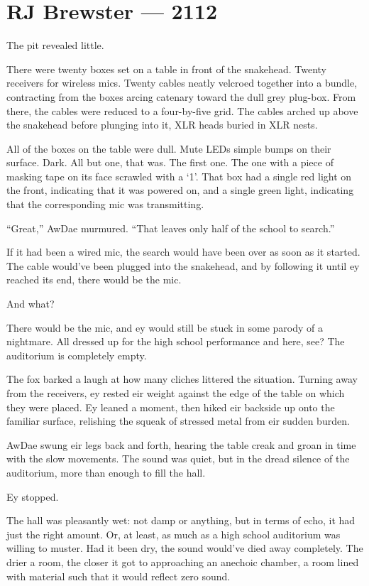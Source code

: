 \hypertarget{rj-brewster-2112}{%
\chapter*{RJ Brewster — 2112}\label{rj-brewster-2112}}

The pit revealed little.

There were twenty boxes set on a table in front of the snakehead. Twenty receivers for wireless mics. Twenty cables neatly velcroed together into a bundle, contracting from the boxes arcing catenary toward the dull grey plug-box. From there, the cables were reduced to a four-by-five grid. The cables arched up above the snakehead before plunging into it, XLR heads buried in XLR nests.

All of the boxes on the table were dull. Mute LEDs simple bumps on their surface. Dark. All but one, that was. The first one. The one with a piece of masking tape on its face scrawled with a `1'. That box had a single red light on the front, indicating that it was powered on, and a single green light, indicating that the corresponding mic was transmitting.

``Great,'' AwDae murmured. ``That leaves only half of the school to search.''

If it had been a wired mic, the search would have been over as soon as it started. The cable would've been plugged into the snakehead, and by following it until ey reached its end, there would be the mic.

And what?

There would be the mic, and ey would still be stuck in some parody of a nightmare. All dressed up for the high school performance and here, see? The auditorium is completely empty.

The fox barked a laugh at how many cliches littered the situation. Turning away from the receivers, ey rested eir weight against the edge of the table on which they were placed. Ey leaned a moment, then hiked eir backside up onto the familiar surface, relishing the squeak of stressed metal from eir sudden burden.

AwDae swung eir legs back and forth, hearing the table creak and groan in time with the slow movements. The sound was quiet, but in the dread silence of the auditorium, more than enough to fill the hall.

Ey stopped.

The hall was pleasantly wet: not damp or anything, but in terms of echo, it had just the right amount. Or, at least, as much as a high school auditorium was willing to muster. Had it been dry, the sound would've died away completely. The drier a room, the closer it got to approaching an anechoic chamber, a room lined with material such that it would reflect zero sound.

